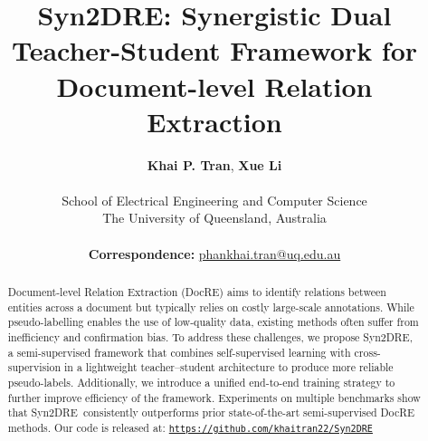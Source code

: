 \documentclass[11pt]{article}
\title{Syn2DRE: Synergistic Dual Teacher-Student Framework for Document-level Relation Extraction}
\author{
     \textbf{Khai P. Tran},
     \textbf{Xue Li}
    \\
    \\
     School of Electrical Engineering and Computer Science \\ The University of Queensland, Australia \\
    \\
     \small{
       \textbf{Correspondence:} \href{mailto:phankhai.tran@uq.edu.au}{phankhai.tran@uq.edu.au}
     }
}
\newcommand\model{Syn2DRE}
\begin{document}
\maketitle
\begin{abstract}
    Document-level Relation Extraction (DocRE) aims to identify relations between entities across a document but typically relies on costly large-scale annotations. While pseudo-labelling enables the use of low-quality data, existing methods often suffer from inefficiency and confirmation bias. To address these challenges, we propose \model, a semi-supervised framework that combines self-supervised learning with cross-supervision in a lightweight teacher–student architecture to produce more reliable pseudo-labels. Additionally, we introduce a unified end-to-end training strategy to further improve efficiency of the framework. Experiments on multiple benchmarks show that \model\ consistently outperforms prior state-of-the-art semi-supervised DocRE methods. Our code is released at: {\tt \href{https://github.com/khaitran22/Syn2DRE}{https://github.com/khaitran22/Syn2DRE}}

\end{abstract}








\end{document}
